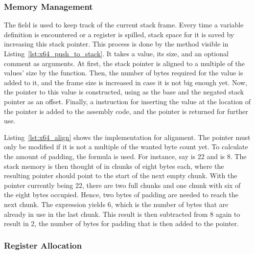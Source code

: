 \subsubsection{Memory Management}

The  field is used to keep track of the current stack frame.
Every time a variable definition is encountered or a register is spilled, stack space for it is saved by increasing this stack pointer.
This process is done by the  method visible in Listing~\ref{lst:x64_push_to_stack}.
It takes a value, its size, and an optional comment as arguments.
At first, the stack pointer is aligned to a multiple of the values' size by the  function.
Then, the number of bytes required for the value is added to it, and the frame size is increased in case it is not big enough yet.
Now, the pointer to this value is constructed, using  as the base and the negated stack pointer as an offset.
Finally, a  instruction for inserting the value at the location of the pointer is added to the assembly code, and the pointer is returned for further use.


Listing~\ref{lst:x64_align} shows the implementation for alignment.
The pointer must only be modified if it is not a multiple of the wanted byte count yet.
To calculate the amount of padding, the formula  is used.
For instance, say  is 22 and  is 8.
The stack memory is then thought of in chunks of eight bytes each, where the resulting pointer should point to the start of the next empty chunk.
With the pointer currently being 22, there are two full chunks and one chunk with six of the eight bytes occupied.
Hence, two bytes of padding are needed to reach the next chunk.
The expression  yields 6, which is the number of bytes that are already in use in the last chunk.
This result is then subtracted from 8 again to result in 2, the number of bytes for padding that is then added to the pointer.


\subsubsection{Register Allocation}

